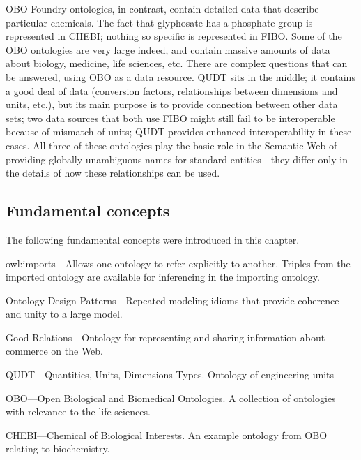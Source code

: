 OBO Foundry
ontologies, in contrast, contain detailed data that describe particular 
chemicals.  The fact that glyphosate has a phosphate group is represented 
in CHEBI; nothing so specific is represented in FIBO. 
Some of the OBO ontologies are very large indeed, and contain massive
amounts of data about biology, medicine, life sciences, etc. There are
complex questions that can be answered, using OBO as a data resource.
QUDT sits in the middle; it contains a good deal of data (conversion
factors, relationships between dimensions and units, etc.), but its main
purpose is to provide connection between other data sets; two data
sources that both use FIBO might still fail to be
interoperable because of mismatch of units; QUDT provides enhanced
interoperability in these cases. All three of these ontologies play the
basic role in the Semantic Web of providing globally unambiguous names
for standard entities---they differ only in the details of how these
relationships can be used.

\subsection{Fundamental concepts}

The following fundamental concepts were introduced in this chapter.

owl:imports---Allows one ontology to refer explicitly to another.
Triples from the imported ontology are available for inferencing in the
importing ontology.

Ontology Design Patterns---Repeated modeling idioms that provide
coherence and unity to a large model.

Good Relations---Ontology for representing and sharing information about
commerce on the Web.

QUDT---Quantities, Units, Dimensions Types. Ontology of engineering
units

OBO---Open Biological and Biomedical Ontologies. A collection of
ontologies with relevance to the life sciences.

CHEBI---Chemical of Biological Interests. An example ontology from OBO
relating to biochemistry.
